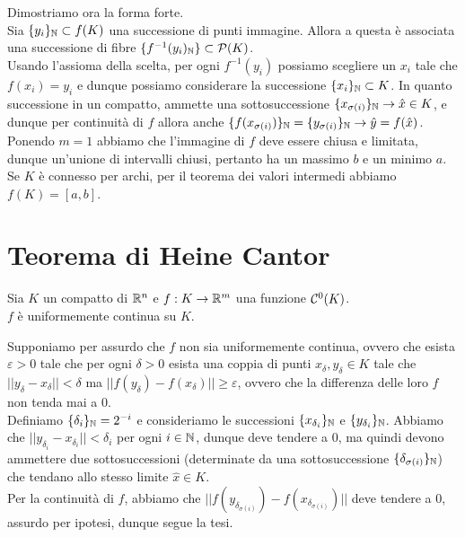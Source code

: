 \documentclass[openany]{book}
\begin{document}
    Dimostriamo ora la forma forte.\\
    Sia $\{y_i\}_{\mathbb{N}} \subset f(K)$ una successione di punti immagine. Allora a questa è associata una successione di fibre $\{f^{-1}(y_i)_{\mathbb{N}}\} \subset \mathcal{P}(K)$.\\
    Usando l'assioma della scelta, per ogni $f^{-1}(y_i)$ possiamo scegliere un $x_i$ tale che $f(x_i) = y_i$ e dunque possiamo considerare la successione $\{x_i\}_{\mathbb{N}} \subset K$. In quanto successione in un compatto, ammette una sottosuccessione $\{x_{\sigma(i)}\}_{\mathbb{N}}\to\hat{x}\in K$, e dunque per continuità di $f$ allora anche $\{f(x_{\sigma(i)})\}_{\mathbb{N}} = \{y_{\sigma(i)}\}_{\mathbb{N}} \to \hat{y} = f(\hat{x})$.\\
    Ponendo $m=1$ abbiamo che l'immagine di $f$ deve essere chiusa e limitata, dunque un'unione di intervalli chiusi, pertanto ha un massimo $b$ e un minimo $a$.\\
    Se $K$ è connesso per archi, per il teorema dei valori intermedi abbiamo $f(K)=[a,b]$.

\section{Teorema di Heine Cantor}

\begin{theorem}{}{}
    Sia $K$ un compatto di $\mathbb{R}^n$ e $f : K \to \mathbb{R}^m$ una funzione $\mathcal{C}^0(K)$.\\
    $f$ è uniformemente continua su $K$.
\end{theorem}

    Supponiamo per assurdo che $f$ non sia uniformemente continua, ovvero che esista $\varepsilon>0$ tale che per ogni $\delta>0$ esista una coppia di punti $x_\delta, y_\delta \in K$ tale che $||y_\delta - x_\delta||<\delta$ ma $||f(y_\delta) - f(x_\delta)||\ge \varepsilon$, ovvero che la differenza delle loro $f$ non tenda mai a $0$.\\
    Definiamo $\{\delta_{i}\}_{\mathbb{N}} = 2^{-i}$ e consideriamo le successioni $\{x_{\delta_i}\}_{\mathbb{N}}$ e $\{y_{\delta_i}\}_{\mathbb{N}}$. Abbiamo che $||y_{\delta_i} - x_{\delta_i}||<\delta_i$ per ogni $i \in \mathbb{N}$, dunque deve tendere a 0, ma quindi devono ammettere due sottosuccessioni (determinate da una sottosuccessione $\{\delta_{\sigma(i)}\}_{\mathbb{N}}$) che tendano allo stesso limite $\hat{x} \in K$.\\
    Per la continuità di $f$, abbiamo che $||f(y_{\delta_{\sigma(i)}}) - f(x_{\delta_{\sigma(i)}})||$ deve tendere a $0$, assurdo per ipotesi, dunque segue la tesi. 
\end{document}
